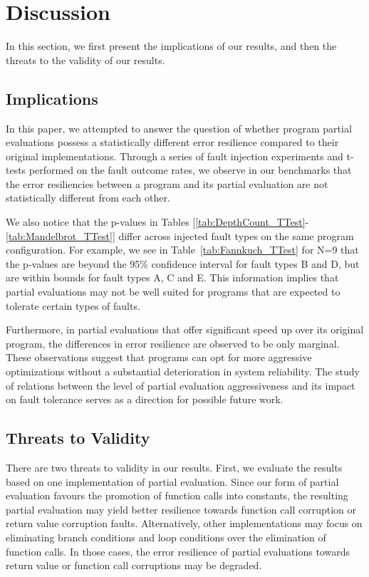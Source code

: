 \section{Discussion}
\label{sec:discussion}
In this section, we first present the implications of our results, and then the threats to the validity of our results.

\subsection{Implications}
\label{sec:implications}
In this paper, we attempted to answer the question of whether program partial evaluations possess a statistically different error resilience compared to their original implementations. 
Through a series of fault injection experiments and t-tests performed on the fault outcome rates, we observe in our benchmarks that the error resiliencies between a program and its partial evaluation are not statistically different from each other.

We also notice that the p-values in Tables [\ref{tab:DepthCount_TTest}-\ref{tab:Mandelbrot_TTest}] differ across injected fault types on the same program configuration.
For example, we see in Table~\ref{tab:Fannkuch_TTest} for N=9 that the p-values are beyond the 95\% confidence interval for fault types B and D, but are within bounds for fault types A, C and E.   
This information implies that partial evaluations may not be well suited for programs that are expected to tolerate certain types of faults. 

Furthermore, in partial evaluations that offer significant speed up over its original program, the differences in error resilience are observed to be only marginal. These observations suggest that programs can opt for more aggressive optimizations without a substantial deterioration in system reliability.
The study of relations between the level of partial evaluation aggressiveness and its impact on fault tolerance serves as a direction for possible future work.


\subsection{Threats to Validity}
\label{sec:validity}
There are two threats to validity in our results.
First, we evaluate the results based on one implementation of partial evaluation.
Since our form of partial evaluation favours the promotion of function calls into constants, the resulting partial evaluation may yield better resilience towards function call corruption or return value corruption faults.
Alternatively, other implementations may focus on eliminating branch conditions and loop conditions over the elimination of function calls.
In those cases, the error resilience of partial evaluations towards return value or function call corruptions may be degraded. 

